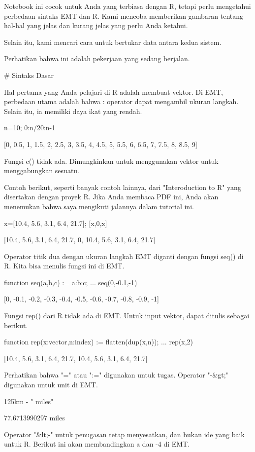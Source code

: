 \documentclass{article}
\begin{document}
Notebook ini cocok untuk Anda yang terbiasa dengan R, tetapi perlu
mengetahui perbedaan sintaks EMT dan R. Kami mencoba memberikan
gambaran tentang hal-hal yang jelas dan kurang jelas yang perlu Anda
ketahui.


Selain itu, kami mencari cara untuk bertukar data antara kedua sistem.


Perhatikan bahwa ini adalah pekerjaan yang sedang berjalan.


# Sintaks Dasar

Hal pertama yang Anda pelajari di R adalah membuat vektor. Di EMT,
perbedaan utama adalah bahwa : operator dapat mengambil ukuran
langkah. Selain itu, ia memiliki daya ikat yang rendah.


\>n=10; 0:n/20:n-1


    [0,  0.5,  1,  1.5,  2,  2.5,  3,  3.5,  4,  4.5,  5,  5.5,  6,  6.5,
    7,  7.5,  8,  8.5,  9]

Fungsi c() tidak ada. Dimungkinkan untuk menggunakan vektor untuk
menggabungkan sesuatu.


Contoh berikut, seperti banyak contoh lainnya, dari "Interoduction to
R" yang disertakan dengan proyek R. Jika Anda membaca PDF ini, Anda
akan menemukan bahwa saya mengikuti jalannya dalam tutorial ini.


\>x=[10.4, 5.6, 3.1, 6.4, 21.7]; [x,0,x]


    [10.4,  5.6,  3.1,  6.4,  21.7,  0,  10.4,  5.6,  3.1,  6.4,  21.7]

Operator titik dua dengan ukuran langkah EMT diganti dengan fungsi
seq() di R. Kita bisa menulis fungsi ini di EMT.


\>function seq(a,b,c) := a:b:c; ...  
\>   seq(0,-0.1,-1)


    [0,  -0.1,  -0.2,  -0.3,  -0.4,  -0.5,  -0.6,  -0.7,  -0.8,  -0.9,  -1]

Fungsi rep() dari R tidak ada di EMT. Untuk input vektor, dapat
ditulis sebagai berikut.


\>function rep(x:vector,n:index) := flatten(dup(x,n)); ...  
\>   rep(x,2)


    [10.4,  5.6,  3.1,  6.4,  21.7,  10.4,  5.6,  3.1,  6.4,  21.7]

Perhatikan bahwa "=" atau ":=" digunakan untuk tugas. Operator "-&gt;"
digunakan untuk unit di EMT.


\>125km -\> " miles"


    77.6713990297 miles

Operator "&lt;-" untuk penugasan tetap menyesatkan, dan bukan ide yang
baik untuk R. Berikut ini akan membandingkan a dan -4 di EMT.
\end{document}
